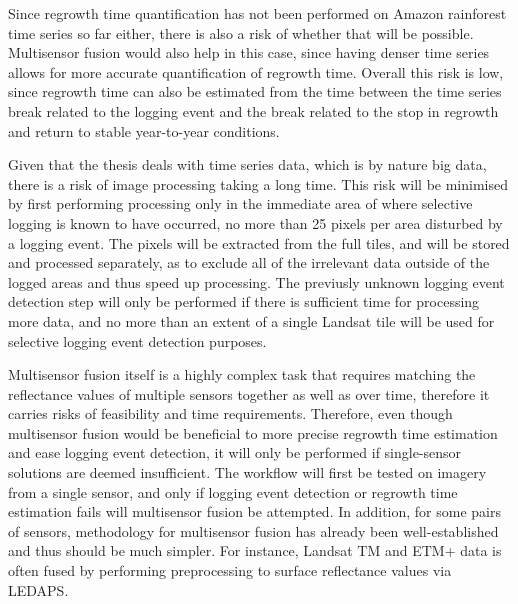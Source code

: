 \documentclass[a4paper,10pt]{article}
\begin{document}
Since regrowth time quantification has not been performed on Amazon rainforest time series so far either, there is also a risk of whether that will be possible. Multisensor fusion would also help in this case, since having denser time series allows for more accurate quantification of regrowth time. Overall this risk is low, since regrowth time can also be estimated from the time between the time series break related to the logging event and the break related to the stop in regrowth and return to stable year-to-year conditions.

Given that the thesis deals with time series data, which is by nature big data, there is a risk of image processing taking a long time. This risk will be minimised by first performing processing only in the immediate area of where selective logging is known to have occurred, no more than 25 pixels per area disturbed by a logging event. The pixels will be extracted from the full tiles, and will be stored and processed separately, as to exclude all of the irrelevant data outside of the logged areas and thus speed up processing. The previusly unknown logging event detection step will only be performed if there is sufficient time for processing more data, and no more than an extent of a single Landsat tile will be used for selective logging event detection purposes.

Multisensor fusion itself is a highly complex task that requires matching the reflectance values of multiple sensors together as well as over time, therefore it carries risks of feasibility and time requirements. Therefore, even though multisensor fusion would be beneficial to more precise regrowth time estimation and ease logging event detection, it will only be performed if single-sensor solutions are deemed insufficient. The workflow will first be tested on imagery from a single sensor, and only if logging event detection or regrowth time estimation fails will multisensor fusion be attempted. In addition, for some pairs of sensors, methodology for multisensor fusion has already been well-established and thus should be much simpler. For instance, Landsat TM and ETM+ data is often fused by performing preprocessing to surface reflectance values via LEDAPS.

\printnoidxglossary[type=acronym]


\end{document}

